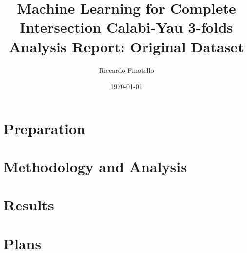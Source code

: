 \documentclass[10pt,a4paper]{article}
\author{Riccardo Finotello}
\title{
    Machine Learning for Complete Intersection Calabi-Yau 3-folds
    \\[0.3cm]
    \Large{\textbf{Analysis Report: Original Dataset}}
}
\date{\today}
\numberwithin{equation}{section}
\numberwithin{figure}{section}
\numberwithin{table}{section}
\begin{document}
    \maketitle
    
    \begin{abstract}
        
    \end{abstract}
    
    \tableofcontents
    
    \section{Preparation}
        
    
    \section{Methodology and Analysis}
        
    
    \section{Results}
    
    \section{Plans}
    
    
\end{document}
